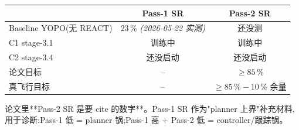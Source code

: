 \documentclass[UTF8, 11pt]{ctexart}
\begin{document}
\begin{center}
\begin{tabular}{lcc}
\hline
                          & Pass-1 SR             & Pass-2 SR             \\
\hline
Baseline YOPO(无 REACT)  & 23\,\% \emph{(2026-05-22 实测)} & 还没测 \\
C1 stage-3.1              & 训练中                & 训练中                \\
C2 stage-3.4              & 还没启动              & 还没启动              \\
论文目标                   & --                    & $\ge 85\,\%$          \\
真飞行目标                 & --                    & $\ge 85\,\% - 10\,\%$ 余量 \\
\hline
\end{tabular}
\end{center}

论文里**Pass-2 SR 是要 cite 的数字**。Pass-1 SR 作为"planner 上界"补充材料,
用于诊断:Pass-1 低 = planner 锅;Pass-1 高 + Pass-2 低 = controller/跟踪锅。
\end{document}

